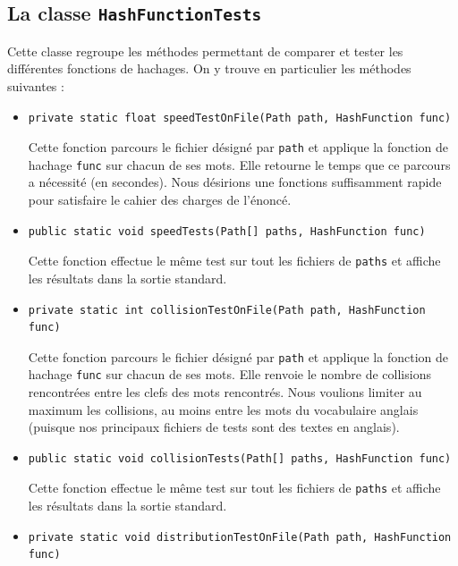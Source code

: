 \documentclass[12pt,a4paper,titlepage]{article}
\newcommand{\class}[1]{\texttt{#1}}
\begin{document}
\subsection{La classe \class{HashFunctionTests}}
Cette classe regroupe les méthodes permettant de comparer et tester les différentes fonctions de hachages.
On y trouve en particulier les méthodes suivantes :
\begin{itemize}

\item \begin{lstlisting}
private static float speedTestOnFile(Path path, HashFunction func)
\end{lstlisting}
Cette fonction parcours le fichier désigné par \class{path} et applique la fonction de hachage \class{func} sur chacun de ses mots. Elle retourne le temps que ce parcours a nécessité (en secondes). Nous désirions une fonctions suffisamment rapide pour satisfaire le cahier des charges de l'énoncé.

\item \begin{lstlisting}
public static void speedTests(Path[] paths, HashFunction func)
\end{lstlisting}
Cette fonction effectue le même test sur tout les fichiers de \class{paths} et affiche les résultats dans la sortie standard.

\item \begin{lstlisting}
private static int collisionTestOnFile(Path path, HashFunction func)
\end{lstlisting}
Cette fonction parcours le fichier désigné par \class{path} et applique la fonction de hachage \class{func} sur chacun de ses mots. Elle renvoie le nombre de collisions rencontrées entre les clefs des mots rencontrés. Nous voulions limiter au maximum les collisions, au moins entre les mots du vocabulaire anglais (puisque nos principaux fichiers de tests sont des textes en anglais).

\item \begin{lstlisting}
public static void collisionTests(Path[] paths, HashFunction func)
\end{lstlisting}
Cette fonction effectue le même test sur tout les fichiers de \class{paths} et affiche les résultats dans la sortie standard.

\item \begin{lstlisting}
private static void distributionTestOnFile(Path path, HashFunction func)
\end{lstlisting}
\label{lstlisting:distributionTestOnFile}


\end{itemize}
\end{document}
